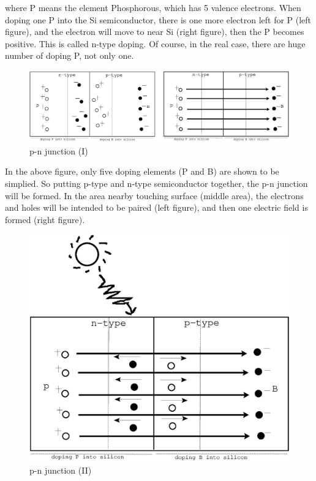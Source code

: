 \documentclass[a4paper, 12pt, titlepage,oneside,drop]{kthesis}
\begin{document}
where P means the element Phosphorous, which has 5 valence electrons. When doping one P into the Si semiconductor, there is one more electron
left for P (left figure), and the electron will move to near Si (right figure), then the P becomes positive. This is called n-type doping. Of course, 
in the real case, there are huge number of doping P, not only one.


\begin{figure}[H]
\centering
\includegraphics[scale=0.7]{sc4.eps}
\caption{p-n junction (I) }
\label{sc4}
\end{figure}
 
In the above figure, only five doping elements (P and B) are shown to be simplied. So putting p-type and n-type semiconductor together, the p-n junction will be formed.
In the area nearby touching surface (middle area), the electrons and holes will be intended to be paired (left figure), and then one electric field is formed 
(right figure).  

\begin{figure}[H]
\centering
\includegraphics[scale=0.4]{sc5.eps}
\caption{p-n junction (II)}
\label{sc5}
\end{figure}
\end{document}
